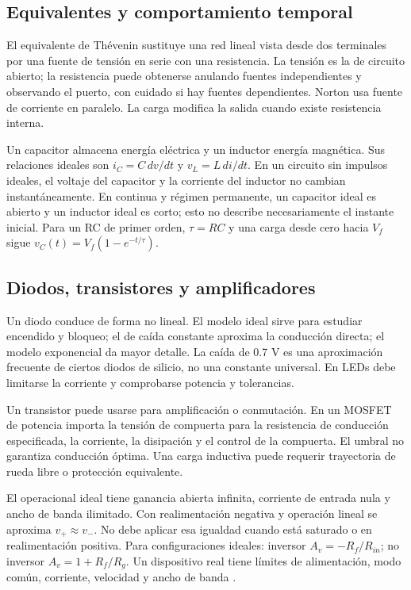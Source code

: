 \subsection{Equivalentes y comportamiento temporal}
El equivalente de Thévenin sustituye una red lineal vista desde dos terminales por una fuente de tensión en serie con una resistencia. La tensión es la de circuito abierto; la resistencia puede obtenerse anulando fuentes independientes y observando el puerto, con cuidado si hay fuentes dependientes. Norton usa fuente de corriente en paralelo. La carga modifica la salida cuando existe resistencia interna.

Un capacitor almacena energía eléctrica y un inductor energía magnética. Sus relaciones ideales son $i_C=C\,dv/dt$ y $v_L=L\,di/dt$. En un circuito sin impulsos ideales, el voltaje del capacitor y la corriente del inductor no cambian instantáneamente. En continua y régimen permanente, un capacitor ideal es abierto y un inductor ideal es corto; esto no describe necesariamente el instante inicial. Para un RC de primer orden, $\tau=RC$ y una carga desde cero hacia $V_f$ sigue $v_C(t)=V_f(1-e^{-t/\tau})$.

\subsection{Diodos, transistores y amplificadores}
Un diodo conduce de forma no lineal. El modelo ideal sirve para estudiar encendido y bloqueo; el de caída constante aproxima la conducción directa; el modelo exponencial da mayor detalle. La caída de 0.7 V es una aproximación frecuente de ciertos diodos de silicio, no una constante universal. En LEDs debe limitarse la corriente y comprobarse potencia y tolerancias.

Un transistor puede usarse para amplificación o conmutación. En un MOSFET de potencia importa la tensión de compuerta para la resistencia de conducción especificada, la corriente, la disipación y el control de la compuerta. El umbral no garantiza conducción óptima. Una carga inductiva puede requerir trayectoria de rueda libre o protección equivalente.

El operacional ideal tiene ganancia abierta infinita, corriente de entrada nula y ancho de banda ilimitado. Con realimentación negativa y operación lineal se aproxima $v_+\approx v_-$. No debe aplicar esa igualdad cuando está saturado o en realimentación positiva. Para configuraciones ideales: inversor $A_v=-R_f/R_{in}$; no inversor $A_v=1+R_f/R_g$. Un dispositivo real tiene límites de alimentación, modo común, corriente, velocidad y ancho de banda \cite[capítulos Diodes, Transistors y Operational Amplifiers]{electronics}.

